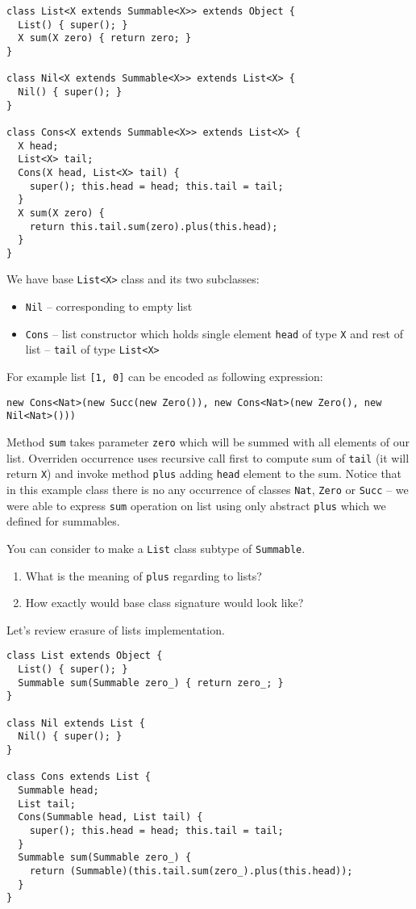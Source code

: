 \documentclass{article}[12pt]
\begin{document}
\begin{verbatim}
class List<X extends Summable<X>> extends Object {
  List() { super(); }
  X sum(X zero) { return zero; }
}

class Nil<X extends Summable<X>> extends List<X> {
  Nil() { super(); }
}

class Cons<X extends Summable<X>> extends List<X> {
  X head;
  List<X> tail;
  Cons(X head, List<X> tail) {
    super(); this.head = head; this.tail = tail;
  }
  X sum(X zero) {
    return this.tail.sum(zero).plus(this.head);
  }
}
\end{verbatim}
We have base \texttt{List<X>} class and its two subclasses:
\begin{itemize}
\item \texttt{Nil} -- corresponding to empty list
\item \texttt{Cons} -- list constructor which holds single
  element \texttt{head} of type \texttt{X} and rest of list
   -- \texttt{tail} of type \texttt{List<X>}
\end{itemize}
For example list \texttt{[1, 0]} can be encoded as following
expression:

\begin{verbatim}
new Cons<Nat>(new Succ(new Zero()), new Cons<Nat>(new Zero(), new Nil<Nat>()))
\end{verbatim}

Method \texttt{sum} takes parameter \texttt{zero} which will
be summed with all elements of our list. Overriden occurrence
uses recursive call first to compute sum of \texttt{tail} (it will
return \texttt{X}) and invoke method \texttt{plus} adding
\texttt{head} element to the sum. Notice that in this example
class there is no any occurrence of classes \texttt{Nat},
\texttt{Zero} or \texttt{Succ} -- we were able to express
\texttt{sum} operation on list using only abstract \texttt{plus}
which we defined for summables.

You can consider to make a \texttt{List} class subtype of
\texttt{Summable}.
\begin{enumerate}
\item What is the meaning of \texttt{plus} regarding to lists?
\item How exactly would base class signature would look like?
\end{enumerate}

Let's review erasure of lists implementation.

\begin{verbatim}
class List extends Object {
  List() { super(); }
  Summable sum(Summable zero_) { return zero_; }
}

class Nil extends List {
  Nil() { super(); }
}

class Cons extends List {
  Summable head;
  List tail;
  Cons(Summable head, List tail) {
    super(); this.head = head; this.tail = tail;
  }
  Summable sum(Summable zero_) {
    return (Summable)(this.tail.sum(zero_).plus(this.head));
  }
}
\end{verbatim}
\end{document}
